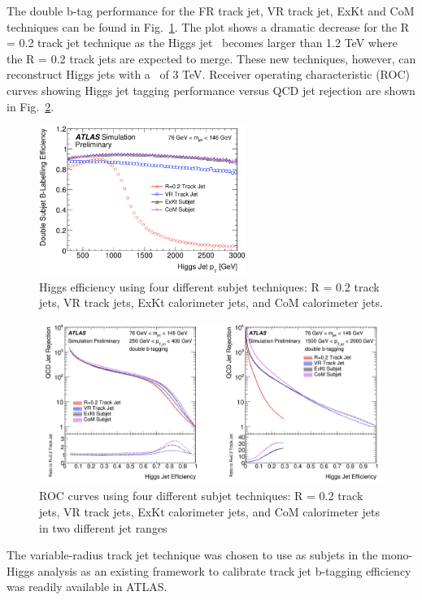 \par The double b-tag performance for the FR track jet, VR track jet, ExKt and CoM techniques can be found in Fig.~\ref{fig:higgs_pt}.
The plot shows a dramatic decrease for the R = 0.2 track jet technique as the Higgs jet \pt~becomes larger than 1.2 TeV where the 
R = 0.2 track jets are expected to merge. These new techniques, however, can reconstruct Higgs jets with a \pt~of 3 TeV. Receiver operating characteristic (ROC) curves showing Higgs jet tagging performance versus 
QCD jet rejection are shown in Fig.~\ref{fig:higgs_ROC}.

\begin{figure}[htbp]
    \centering
    \includegraphics[width=0.6\textwidth]{chapters/c5/figures/higgs_pt}
    \caption{Higgs efficiency using four different subjet techniques: R = 0.2 track jets, VR track jets, ExKt calorimeter jets, and CoM calorimeter jets.}
    \label{fig:higgs_pt}
\end{figure}

\begin{figure}[htbp]
    \centering
    \includegraphics[width=1\textwidth]{chapters/c5/figures/higgs_ROC}
    \caption{ROC curves using four different subjet techniques: R = 0.2 track jets, VR track jets, ExKt calorimeter jets, and CoM calorimeter jets in two different jet \pt ranges}
    \label{fig:higgs_ROC}
\end{figure}

\par The variable-radius track jet technique was chosen to use as subjets in the mono-Higgs analysis as an existing framework to calibrate track jet b-tagging efficiency was readily available in ATLAS.
